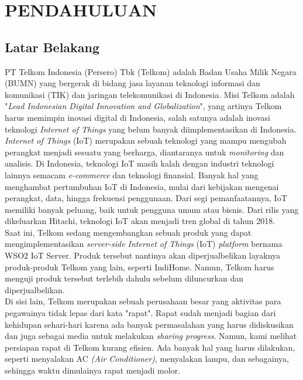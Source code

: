 \chapter{PENDAHULUAN}

\section{Latar Belakang}
\tab PT Telkom Indonesia (Persero) Tbk (Telkom) adalah Badan Usaha Milik Negara (BUMN) yang bergerak di bidang jasa layanan teknologi informasi dan komunikasi (TIK) dan jaringan telekomunikasi di Indonesia. Misi Telkom adalah "\textit{Lead Indonesian Digital Innovation and Globalization}",\cite{Profil Telkom} yang artinya Telkom harus memimpin inovasi digital di Indonesia, salah satunya adalah inovasi teknologi \textit{Internet of Things} yang belum banyak diimplementasikan di Indonesia. \\
\tab \textit{Internet of Things} (IoT) merupakan sebuah teknologi yang mampu mengubah perangkat menjadi sesuatu yang berharga, diantaranya untuk \textit{monitoring} dan analisis. Di Indonesia, teknologi IoT masih kalah dengan industri teknologi lainnya semacam \textit{e-commerce} dan teknologi finansial. Banyak hal yang menghambat pertumbuhan IoT di Indonesia, mulai dari kebijakan mengenai perangkat, data, hingga frekuensi penggunaan. Dari segi pemanfaatannya, IoT memiliki banyak peluang, baik untuk pengguna umum atau bisnis. Dari rilis yang dikeluarkan Hitachi, teknologi IoT akan menjadi tren global di tahun 2018.\cite{Perkembangan Industri Internet of Things di Indonesia Tahun 2017} \\
\tab Saat ini, Telkom sedang mengembangkan sebuah produk yang dapat mengimplementasikan \textit{server-side Internet of Things} (IoT) \textit{platform} bernama WSO2 IoT Server. Produk tersebut nantinya akan diperjualbelikan layaknya produk-produk Telkom yang lain, seperti IndiHome. Namun, Telkom harus menguji produk tersebut terlebih dahulu sebelum diluncurkan dan diperjualbelikan. \\
\tab Di sisi lain, Telkom merupakan sebuah perusahaan besar yang aktivitas para pegawainya tidak lepas dari kata "rapat". Rapat sudah menjadi bagian dari kehidupan sehari-hari karena ada banyak permasalahan yang harus didiskusikan dan juga sebagai media untuk melakukan \textit{sharing progress}. Namun, kami melihat persiapan rapat di Telkom kurang efisien. Ada banyak hal yang harus dilakukan, seperti menyalakan AC \textit{(Air Conditioner)}, menyalakan lampu, dan sebagainya, sehingga waktu dimulainya rapat menjadi molor. \\
